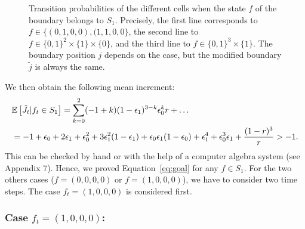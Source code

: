 \documentclass[11pt]{article}
\theoremstyle{plain}
\theoremstyle{definition}
\theoremstyle{remark}
\newcommand{\esp}[1]{\mathbb{E}\left[ #1 \right]}
\begin{document}
\begin{figure}
{\begin{tikzpicture}[scale= 0.8]
\end{tikzpicture}
    }
    \caption{Transition probabilities of the different cells when the state $f$ of the boundary belongs to $S_1$. Precisely, the first line corresponds to $f \in \{(0,1,0,0),(1,1,0,0\}$, the second line to $f \in \{0,1\}^2 \times \{1\} \times \{0\}$, and the third line to $f \in \{0,1\}^3 \times \{1\}$. The boundary position $j$ depends on the case, but the modified boundary $\tilde j$ is always the same.}
    \label{fig:transS1}
    
    \bigskip
\end{figure}


We then obtain the following mean increment:
\begin{align}
& \esp{\Tilde{J_t}|f_t\in S_1} = \sum_{k=0}^2 (-1+k) (1-\epsilon_1)^{3-k} \epsilon_0^k r + \dots \nonumber \\
& =-1+\epsilon_0+2\epsilon_1+\epsilon_0^2+3\epsilon_1^2 ( 1 -\epsilon_1) +\epsilon_0\epsilon_1(1-\epsilon_0)+\epsilon_1^4+\epsilon_0^3\epsilon_1+\frac{(1-r)^{3}}{r} > -1. \label{eq:driftS1} 
\end{align}
This can be checked by hand or with the help of a computer algebra system (see Appendix 7). Hence, we proved Equation~\eqref{eq:goal} for any $f \in S_1$. For the two others cases ($f = (0,0,0,0)$ or $f=(1,0,0,0)$), we have to consider two time steps. The case $f_t = (1,0,0,0)$ is considered first.

\subsubsection{Case $f_t = (1,0,0,0)$:}
\end{document}

